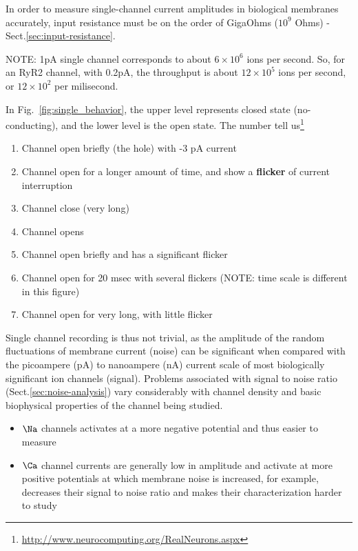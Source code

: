 \begin{mdframed}

In order to measure single-channel current amplitudes in biological membranes
accurately, input resistance must be on the order of GigaOhms ($10^9$ Ohms) -
Sect.\ref{sec:input-resistance}.

NOTE: 1pA single channel corresponds to about $6\times 10^6$ ions per second.
So, for an RyR2 channel, with 0.2pA, the throughput is about $12\times 10^5$ ions
per second, or $12\times 10^2$ per milisecond.
\end{mdframed}

In Fig.~\ref{fig:single_behavior}, the upper level represents closed state
(no-conducting), and the lower level is the open state. The number tell
us\footnote{\url{http://www.neurocomputing.org/RealNeurons.aspx}}
\begin{enumerate}
\item Channel open briefly (the hole) with -3 pA current
\item Channel open for a longer amount of time, and show a
  {\bf flicker} of current interruption
\item Channel close (very long)
\item Channel opens
\item Channel open briefly and has a significant flicker
\item Channel open for 20 msec with several flickers (NOTE: time scale
is different in this figure)
\item Channel open for very long, with little flicker
\end{enumerate}

Single channel recording is thus not trivial, as the amplitude of the random
fluctuations of membrane current (noise) can be significant when compared with
the picoampere (pA) to nanoampere (nA) current scale of most biologically
significant ion channels (signal). Problems associated with signal to noise
ratio (Sect.\ref{sec:noise-analysis}) vary considerably with channel density and
basic biophysical properties of the channel being studied.
\begin{itemize}
  \item $\Na$ channels activates at a more negative potential and thus easier to
  measure

  \item $\Ca$ channel currents are generally low in amplitude and activate at
more positive potentials at which membrane noise is increased, for example,
decreases their signal to noise ratio and makes their characterization harder to
study
\end{itemize}

